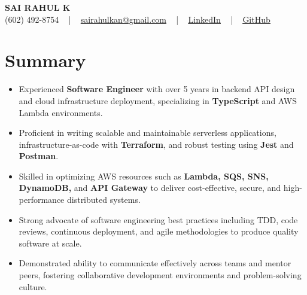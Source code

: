 \documentclass[letterpaper,11pt]{article}
\newcommand{\resumeItem}[1]{
  \item\footnotesize{
    {#1 \vspace{-2pt}}
  }
}
\newcommand{\resumeItemListStart}{\begin{itemize}[leftmargin=*]}
\newcommand{\resumeItemListEnd}{\end{itemize}\vspace{-5pt}}
\begin{document}
\begin{center}
    {\fontsize{14pt}{12pt}\selectfont \textbf{\MakeUppercase{Sai Rahul K}}}\\ \vspace{2pt}
    \fontsize{10pt}{12pt}\selectfont (602) 492-8754 ~ | ~ \href{mailto:sairahulkan@gmail.com}{sairahulkan@gmail.com} ~ | ~
    \href{https://www.linkedin.com/in/rq123/}{\color{blue}\underline{LinkedIn}} ~ | ~
    \href{https://github.com/kanrahuldo}{\color{blue}\underline{GitHub}}~
    \vspace{-8pt}
\end{center}

\section{Summary}
\fontsize{9pt}{10pt}\selectfont
\resumeItemListStart
    \resumeItem{Experienced \textbf{Software Engineer} with over 5 years in backend API design and cloud infrastructure deployment, specializing in \textbf{TypeScript} and AWS Lambda environments.}
    \resumeItem{Proficient in writing scalable and maintainable serverless applications, infrastructure-as-code with \textbf{Terraform}, and robust testing using \textbf{Jest} and \textbf{Postman}.}
    \resumeItem{Skilled in optimizing AWS resources such as \textbf{Lambda, SQS, SNS, DynamoDB,} and \textbf{API Gateway} to deliver cost-effective, secure, and high-performance distributed systems.}
    \resumeItem{Strong advocate of software engineering best practices including TDD, code reviews, continuous deployment, and agile methodologies to produce quality software at scale.}
    \resumeItem{Demonstrated ability to communicate effectively across teams and mentor peers, fostering collaborative development environments and problem-solving culture.}
\resumeItemListEnd
\vspace{-6pt}
\end{document}
